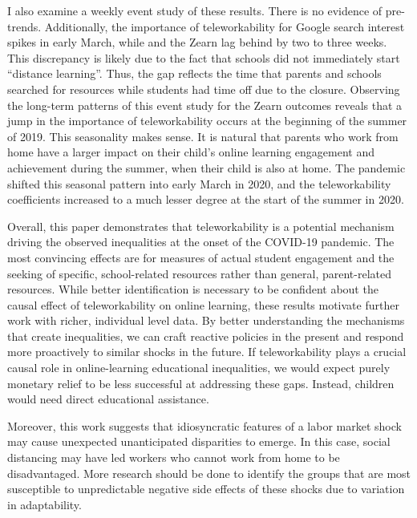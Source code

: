 \if{}
I also examine a weekly event study of these results.
There is no evidence of pre-trends.
Additionally, the importance of teleworkability for Google search interest spikes in early March, while and the Zearn lag behind by two to three weeks.
This discrepancy is likely due to the fact that schools did not immediately start ``distance learning''.
Thus, the gap reflects the time that parents and schools searched for resources while students had time off due to the closure.
Observing the long-term patterns of this event study for the Zearn outcomes reveals that a jump in the importance of teleworkability occurs at the beginning of the summer of 2019.
This seasonality makes sense.
It is natural that parents who work from home have a larger impact on their child's online learning engagement and achievement during the summer, when their child is also at home.
The pandemic shifted this seasonal pattern into early March in 2020, and the teleworkability coefficients increased to a much lesser degree at the start of the summer in 2020.
\fi

Overall, this paper demonstrates that teleworkability is a potential mechanism driving the observed inequalities at the onset of the COVID-19 pandemic.
The most convincing effects are for measures of actual student engagement and the seeking of specific, school-related resources rather than general, parent-related resources.
While better identification is necessary to be confident about the causal effect of teleworkability on online learning, these results motivate further work with richer, individual level data.
By better understanding the mechanisms that create inequalities, we can craft reactive policies in the present and respond more proactively to similar shocks in the future.
If teleworkability plays a crucial causal role in online-learning educational inequalities, we would expect purely monetary relief to be less successful at addressing these gaps.
Instead, children would need direct educational assistance.

Moreover, this work suggests that idiosyncratic features of a labor market shock may cause unexpected unanticipated disparities to emerge.
In this case, social distancing may have led workers who cannot work from home to be disadvantaged.
More research should be done to identify the groups that are most susceptible to unpredictable negative side effects of these shocks due to variation in adaptability.

